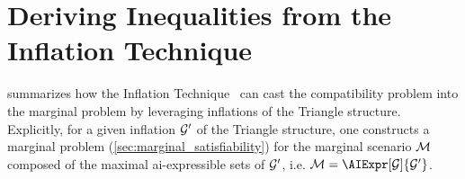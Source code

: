 \documentclass[aps, 10pt, english, twoside, pra, nofootinbib, tightenlines, longbibliography, superscriptaddress]{revtex4-1}
\begin{document}



    \section{Deriving Inequalities from the Inflation Technique}
    \label{sec:deriving_inequalities}

     summarizes how the Inflation Technique~\cite{Inflation} can cast the compatibility problem into the marginal problem by leveraging inflations of the Triangle structure. Explicitly, for a given inflation $\mathcal{G}'$ of the Triangle structure, one constructs a marginal problem (\cref{sec:marginal_satisfiability}) for the marginal scenario $\mathcal{M}$ composed of the maximal ai-expressible sets of $\mathcal{G}'$, i.e. $\mscenario = \AIExpr[\graph]{\graph'}$.
\end{document}
